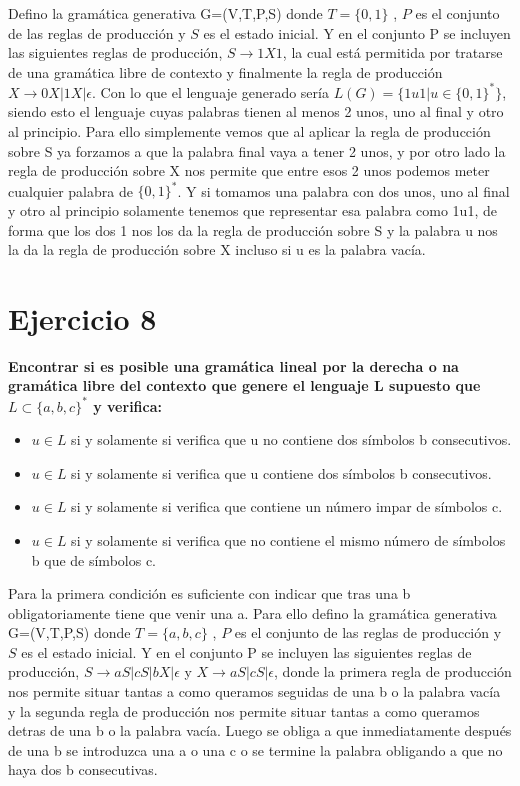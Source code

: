 \documentclass[a4paper,11pt]{article}
\begin{document}
Defino la gramática generativa G=(V,T,P,S) donde $T=\{0,1\}$ , $P$ es el conjunto de las reglas de producción y $S$ es el estado inicial. Y en el conjunto P se incluyen las siguientes reglas de producción, $S \rightarrow 1X1$, la cual está permitida por tratarse de una gramática libre de contexto y finalmente la regla de producción $X \rightarrow 0X|1X|\epsilon$. Con lo que el lenguaje generado sería $L(G)=\{1u1 | u \in \{0,1\}^*\}$, siendo esto el lenguaje cuyas palabras tienen al menos 2 unos, uno al final y otro al principio. Para ello simplemente vemos que al aplicar la regla de producción sobre S ya forzamos a que la palabra final vaya a tener 2 unos, y por otro lado la regla de producción sobre X nos permite que entre esos 2 unos podemos meter cualquier palabra de $\{0,1\}^*$. Y si tomamos una palabra con dos unos, uno al final y otro al principio solamente tenemos que representar esa palabra como 1u1, de forma que los dos 1 nos los da la regla de producción sobre S y la palabra u nos la da la regla de producción sobre X incluso si u es la palabra vacía.

\section{Ejercicio 8}
\textbf{Encontrar si es posible una gramática lineal por la derecha o na gramática libre del contexto que genere el lenguaje L supuesto que $L \subset \{a,b,c\}^*$ y verifica:}

\begin{itemize}
\item $u \in L$ si y solamente si verifica que u no contiene dos símbolos b consecutivos.
\item $u \in L$ si y solamente si verifica que u contiene dos símbolos b consecutivos.
\item $u \in L$ si y solamente si verifica que contiene un número impar de símbolos c.
\item $u \in L$ si y solamente si verifica que no contiene el mismo número de símbolos b que de símbolos c.
\end{itemize}

Para la primera condición es suficiente con indicar que tras una b obligatoriamente tiene que venir una a. Para ello defino la gramática generativa G=(V,T,P,S) donde $T=\{a,b,c\}$ , $P$ es el conjunto de las reglas de producción y $S$ es el estado inicial. Y en el conjunto P se incluyen las siguientes reglas de producción, $S \rightarrow aS|cS|bX|\epsilon$ y $X \rightarrow aS|cS|\epsilon$, donde la primera regla de producción nos permite situar tantas a como queramos seguidas de una b o la palabra vacía y la segunda regla de producción nos permite situar tantas a como queramos detras de una b o la palabra vacía. Luego se obliga a que inmediatamente después de una b se introduzca una a o una c o se termine la palabra obligando a que no haya dos b consecutivas. \\
\end{document}
